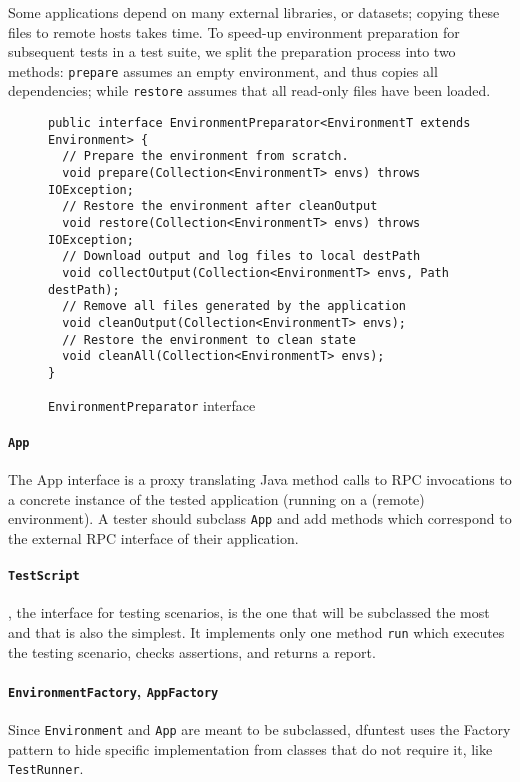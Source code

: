 Some applications depend on many external libraries, or datasets; copying these
files to remote hosts takes time.
To speed-up environment preparation for subsequent tests in a test suite, we
split the preparation process into two methods:
\texttt{prepare} assumes an empty environment, and thus copies all dependencies;
while \texttt{restore} assumes that all read-only files have been loaded.

\begin{figure}[tbp]
\begin{lstlisting}
public interface EnvironmentPreparator<EnvironmentT extends Environment> {
  // Prepare the environment from scratch.
  void prepare(Collection<EnvironmentT> envs) throws IOException;
  // Restore the environment after cleanOutput
  void restore(Collection<EnvironmentT> envs) throws IOException;
  // Download output and log files to local destPath
  void collectOutput(Collection<EnvironmentT> envs, Path destPath);
  // Remove all files generated by the application
  void cleanOutput(Collection<EnvironmentT> envs);
  // Restore the environment to clean state
  void cleanAll(Collection<EnvironmentT> envs);
}
\end{lstlisting}
\caption{\texttt{EnvironmentPreparator} interface}
\label{fig:envprepint}
\end{figure}

\paragraph{\texttt{App}}
The App interface is a proxy translating Java method calls to RPC invocations to a concrete instance of the tested application (running on a (remote) environment).
A tester should subclass \texttt{App} and add methods which correspond to the external RPC interface of their application.

\paragraph{\texttt{TestScript}}, the interface for testing scenarios, is the one
that will be subclassed the most and that is also the simplest. It implements
only one method \texttt{run} which executes the testing scenario, checks
assertions, and returns a report.

\paragraph{\texttt{EnvironmentFactory}, \texttt{AppFactory}} Since
\texttt{Environment} and \texttt{App} are meant to be subclassed, dfuntest uses
the Factory pattern to hide specific implementation from classes that do not require
it, like \texttt{TestRunner}.

